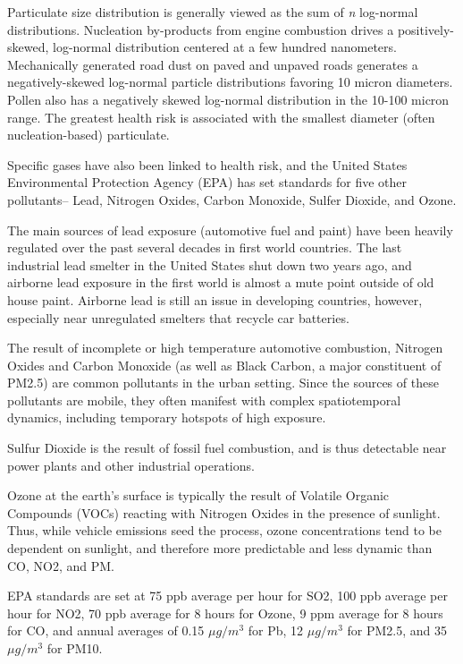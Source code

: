 Particulate size distribution is generally viewed as the sum of \textit{n} log-normal distributions.  Nucleation by-products from engine combustion drives a positively-skewed, log-normal distribution centered at a few hundred nanometers.  Mechanically generated road dust on paved and unpaved roads generates a negatively-skewed log-normal particle distributions favoring 10 micron diameters.  Pollen also has a negatively skewed log-normal distribution in the 10-100 micron range.  The greatest health risk is associated with the smallest diameter (often nucleation-based) particulate.  

Specific gases have also been linked to health risk, and the United States Environmental Protection Agency (EPA) has set standards for five other pollutants-- Lead, Nitrogen Oxides, Carbon Monoxide, Sulfer Dioxide, and Ozone.

The main sources of lead exposure (automotive fuel and paint) have been heavily regulated over the past several decades in first world countries.  The last industrial lead smelter in the United States shut down two years ago, and airborne lead exposure in the first world is almost a mute point outside of old house paint.  Airborne lead is still an issue in developing countries, however, especially near unregulated smelters that recycle car batteries.

The result of incomplete or high temperature automotive combustion, Nitrogen Oxides and Carbon Monoxide (as well as Black Carbon, a major constituent of PM2.5) are common pollutants in the urban setting.  Since the sources of these pollutants are mobile, they often manifest with complex spatiotemporal dynamics, including temporary hotspots of high exposure.

Sulfur Dioxide is the result of fossil fuel combustion, and is thus detectable near power plants and other industrial operations. 
  
Ozone at the earth's surface is typically the result of Volatile Organic Compounds (VOCs) reacting with Nitrogen Oxides in the presence of sunlight.  Thus, while vehicle emissions seed the process, ozone concentrations tend to be dependent on sunlight, and therefore more predictable and less dynamic than CO, NO2, and PM.

EPA standards are set at 75 ppb average per hour for SO2, 100 ppb average per hour for NO2, 70 ppb average for 8 hours for Ozone, 9 ppm average for 8 hours for CO, and annual averages of 0.15 \(\mu g/m^3\) for Pb, 12 \(\mu g/m^3\) for PM2.5, and 35 \(\mu g/m^3\) for PM10.

